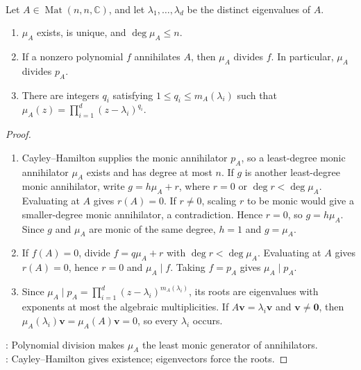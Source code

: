 \begin{theorem} \label{thm:minimal-polynomial-basic-properties} \\
Let $A\in\operatorname{Mat}(n,n,\mathbb{C})$, and let $\lambda_1,\ldots,\lambda_d$ be the distinct eigenvalues of $A$.
\begin{enumerate}[label=(\roman*)]
\setlength{\itemsep}{0pt}
\item $\mu_A$ exists, is unique, and $\deg\mu_A\leq n$.
\item If a nonzero polynomial $f$ annihilates $A$, then $\mu_A$ divides $f$. In particular, $\mu_A$ divides $p_A$.
\item There are integers $q_i$ satisfying $1\leq q_i\leq m_A(\lambda_i)$ such that $\mu_A(z)=\prod\limits_{i=1}^{d}(z-\lambda_i)^{q_i}$.
\end{enumerate}
\begin{proof}
\begin{enumerate}[label=(\roman*)]
\setlength{\itemsep}{0pt}
\item Cayley--Hamilton supplies the monic annihilator $p_A$, so a least-degree monic annihilator $\mu_A$ exists and has degree at most $n$. If $g$ is another least-degree monic annihilator, write $g=h\mu_A+r$, where $r=0$ or $\deg r<\deg\mu_A$. Evaluating at $A$ gives $r(A)=0$. If $r\neq0$, scaling $r$ to be monic would give a smaller-degree monic annihilator, a contradiction. Hence $r=0$, so $g=h\mu_A$.\\
Since $g$ and $\mu_A$ are monic of the same degree, $h=1$ and $g=\mu_A$.
\item If $f(A)=0$, divide $f=q\mu_A+r$ with $\deg r<\deg\mu_A$. Evaluating at $A$ gives $r(A)=0$, hence $r=0$ and $\mu_A\mid f$. Taking $f=p_A$ gives $\mu_A\mid p_A$.
\item Since $\mu_A\mid p_A=\prod_{i=1}^{d}(z-\lambda_i)^{m_A(\lambda_i)}$, its roots are eigenvalues with exponents at most the algebraic multiplicities. If $A\mathbf{v}=\lambda_i\mathbf{v}$ and $\mathbf{v}\neq\mathbf{0}$, then $\mu_A(\lambda_i)\mathbf{v}=\mu_A(A)\mathbf{v}=0$, so every $\lambda_i$ occurs.
\end{enumerate}
: Polynomial division makes $\mu_A$ the least monic generator of annihilators.\\
: Cayley--Hamilton gives existence; eigenvectors force the roots.
\end{proof}
\end{theorem}

